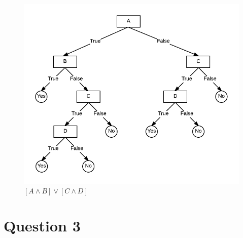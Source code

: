 \documentclass[12pt]{article}
\begin{document}
\begin{figure}[H]
  \centering
  \includegraphics[scale=0.5]{img/hw1_2d}
  \caption{$\left[  A \wedge B\right] \vee \left[  C\wedge D \right]$}
\end{figure}


\section{Question 3}
\end{document}
